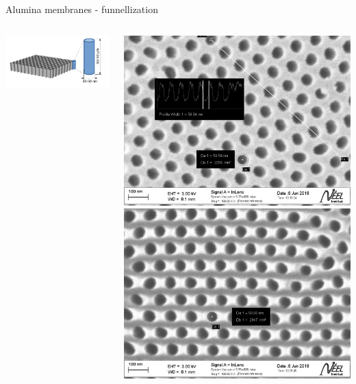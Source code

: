 \documentclass{beamer}
\begin{document}
  \begin{frame}{Alumina membranes - funnellization}
    \begin{columns}[onlytextwidth, T]

        \includegraphics[width=\linewidth]{images/membranes.pdf}
        \pause

        \begin{columns}[onlytextwidth, T]
            \includegraphics[width=\linewidth]{images/295c__al_side.jpg}
            \includegraphics[width=\linewidth]{images/295c_sol_side.jpg}
        \end{columns}
        \pause


\end{columns}
\end{frame}
\end{document}
